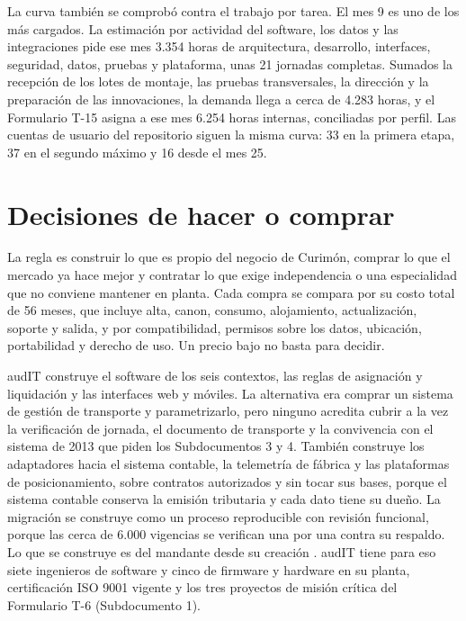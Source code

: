 La curva también se comprobó contra el trabajo por tarea. El mes 9
es uno de los más cargados. La estimación por actividad del software, los datos y las integraciones pide
ese mes 3.354 horas de arquitectura, desarrollo, interfaces, seguridad, datos, pruebas y plataforma, unas
21 jornadas completas. Sumados la recepción de los lotes de montaje, las pruebas transversales, la
dirección y la preparación de las innovaciones, la demanda llega a cerca de 4.283 horas, y el Formulario
T-15 asigna a ese mes 6.254 horas internas, conciliadas por perfil. Las cuentas de usuario del
repositorio siguen la misma curva: 33 en la primera etapa, 37 en el segundo máximo y 16 desde el mes 25.

\section{Decisiones de hacer o comprar}\label{sec:12-decisiones-de-hacer-o-comprar}

La regla es construir lo que es propio del negocio de Curimón, comprar lo que el mercado ya hace mejor y
contratar lo que exige independencia o una especialidad que no conviene mantener en planta. Cada compra
se compara por su costo total de 56 meses, que incluye alta, canon, consumo, alojamiento, actualización,
soporte y salida, y por compatibilidad, permisos sobre los datos, ubicación, portabilidad y derecho de
uso. Un precio bajo no basta para decidir.

audIT construye el software de los seis contextos, las reglas de asignación y liquidación y las
interfaces web y móviles. La alternativa era comprar un sistema de gestión de transporte y
parametrizarlo, pero ninguno acredita cubrir a la vez la verificación de jornada, el documento de
transporte y la convivencia con el sistema de 2013 que piden los Subdocumentos 3 y 4. También construye
los adaptadores hacia el sistema contable, la telemetría de fábrica y las plataformas de posicionamiento,
sobre contratos autorizados y sin tocar sus bases, porque el sistema contable conserva la emisión
tributaria y cada dato tiene su dueño. La migración se construye como un proceso reproducible con
revisión funcional, porque las cerca de 6.000 vigencias se verifican una por una contra su respaldo. Lo
que se construye es del mandante desde su creación . audIT tiene para eso siete
ingenieros de software y cinco de firmware y hardware en su planta, certificación ISO 9001 vigente y los
tres proyectos de misión crítica del Formulario T-6 (Subdocumento 1).

